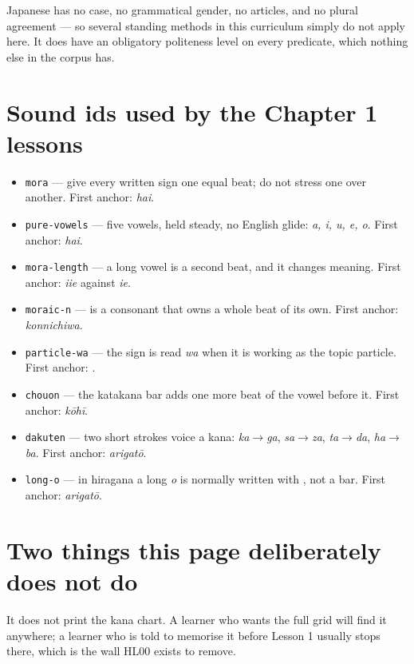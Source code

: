 Japanese has no case, no grammatical gender, no articles, and no plural agreement — so several standing methods in this curriculum simply do not apply here. It does have an obligatory politeness level on every predicate, which nothing else in the corpus has.

\section*{Sound ids used by the Chapter 1 lessons}

\begin{itemize}
\raggedright
\setlength{\itemsep}{0.35em}
  \item \texttt{mora} — give every written sign one equal beat; do not stress one over another. First anchor: \textbf{} \emph{hai}.
  \item \texttt{pure-vowels} — five vowels, held steady, no English glide: \emph{a, i, u, e, o}. First anchor: \textbf{} \emph{hai}.
  \item \texttt{mora-length} — a long vowel is a second beat, and it changes meaning. First anchor: \textbf{} \emph{iie} against \textbf{} \emph{ie}.
  \item \texttt{moraic-n} — \textbf{} is a consonant that owns a whole beat of its own. First anchor: \textbf{} \emph{konnichiwa}.
  \item \texttt{particle-wa} — the sign \textbf{} is read \emph{wa} when it is working as the topic particle. First anchor: \textbf{}.
  \item \texttt{chouon} — the katakana bar \textbf{} adds one more beat of the vowel before it. First anchor: \textbf{} \emph{kōhī}.
  \item \texttt{dakuten} — two short strokes voice a kana: \emph{ka$\to$ga}, \emph{sa$\to$za}, \emph{ta$\to$da}, \emph{ha$\to$ba}. First anchor: \textbf{} \emph{arigatō}.
  \item \texttt{long-o} — in hiragana a long \emph{o} is normally written with \textbf{}, not a bar. First anchor: \textbf{} \emph{arigatō}.
\end{itemize}

\section*{Two things this page deliberately does not do}

It does not print the kana chart. A learner who wants the full grid will find it anywhere; a learner who is told to memorise it before Lesson 1 usually stops there, which is the wall HL00 exists to remove.

